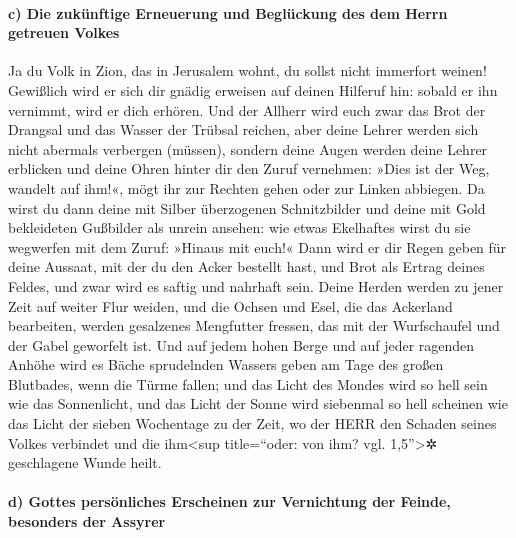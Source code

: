 \hypertarget{c-die-zukuxfcnftige-erneuerung-und-begluxfcckung-des-dem-herrn-getreuen-volkes}{%
\paragraph{c) Die zukünftige Erneuerung und Beglückung des dem Herrn
getreuen
Volkes}\label{c-die-zukuxfcnftige-erneuerung-und-begluxfcckung-des-dem-herrn-getreuen-volkes}}

Ja du Volk in Zion, das in Jerusalem wohnt, du sollst
nicht immerfort weinen! Gewißlich wird er sich dir gnädig erweisen auf
deinen Hilferuf hin: sobald er ihn vernimmt, wird er dich erhören.
Und der Allherr wird euch zwar das Brot der Drangsal und
das Wasser der Trübsal reichen, aber deine Lehrer werden sich nicht
abermals verbergen (müssen), sondern deine Augen werden deine Lehrer
erblicken und deine Ohren hinter dir den Zuruf vernehmen:
»Dies ist der Weg, wandelt auf ihm!«, mögt ihr zur Rechten gehen oder
zur Linken abbiegen. Da wirst du dann deine mit Silber
überzogenen Schnitzbilder und deine mit Gold bekleideten Gußbilder als
unrein ansehen: wie etwas Ekelhaftes wirst du sie wegwerfen mit dem
Zuruf: »Hinaus mit euch!« Dann wird er dir Regen geben
für deine Aussaat, mit der du den Acker bestellt hast, und Brot als
Ertrag deines Feldes, und zwar wird es saftig und nahrhaft sein. Deine
Herden werden zu jener Zeit auf weiter Flur weiden, und
die Ochsen und Esel, die das Ackerland bearbeiten, werden gesalzenes
Mengfutter fressen, das mit der Wurfschaufel und der Gabel geworfelt
ist. Und auf jedem hohen Berge und auf jeder ragenden
Anhöhe wird es Bäche sprudelnden Wassers geben am Tage des großen
Blutbades, wenn die Türme fallen; und das Licht des
Mondes wird so hell sein wie das Sonnenlicht, und das Licht der Sonne
wird siebenmal so hell scheinen wie das Licht der sieben Wochentage zu
der Zeit, wo der HERR den Schaden seines Volkes verbindet und die
ihm\textless sup title=``oder: von ihm? vgl. 1,5''\textgreater✲
geschlagene Wunde heilt.

\hypertarget{d-gottes-persuxf6nliches-erscheinen-zur-vernichtung-der-feinde-besonders-der-assyrer}{%
\paragraph{d) Gottes persönliches Erscheinen zur Vernichtung der Feinde,
besonders der
Assyrer}\label{d-gottes-persuxf6nliches-erscheinen-zur-vernichtung-der-feinde-besonders-der-assyrer}}

